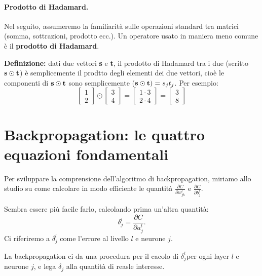 \paragraph{Prodotto di Hadamard.} Nel seguito, assumeremo la familiarità sulle operazioni standard tra matrici (somma, sottrazioni, prodotto ecc.). Un operatore usato in maniera meno comune è il \textbf{prodotto di Hadamard}.


\textbf{Definizione:} dati due vettori \textbf{s} e \textbf{t}, il prodotto di Hadamard tra i due (scritto $\text{\textbf{s}}\odot\text{\textbf{t}}$) è semplicemente il prodtto degli elementi dei due vettori, cioè le componenti di $\text{\textbf{s}}\odot\text{\textbf{t}}$ sono semplicemente ($\text{\textbf{s}}\odot\text{\textbf{t}})=s_jt_j$.
Per esempio:
\begin{equation}
    \begin{bmatrix}
        1\\
        2
    \end{bmatrix}
    \odot
    \begin{bmatrix}
        3\\
        4
    \end{bmatrix}
    =
    \begin{bmatrix}
        1\cdot 3\\
        2\cdot 4
    \end{bmatrix}
    =
    \begin{bmatrix}
        3\\
        8
    \end{bmatrix}
\end{equation}
\newpage
\section{Backpropagation: le quattro equazioni fondamentali}
Per sviluppare la comprensione dell'algoritmo di backpropagation, miriamo allo studio su come calcolare in modo efficiente le quantità $\frac{\partial C}{\partial w^l_{jk}}$ e $\frac{\partial C}{\partial b^l_{j}}$.


Sembra essere più facile farlo, calcolando prima un'altra quantità:
\begin{equation}
    \delta^l_j=\frac{\partial C}{\partial a^l_{j}}.
\end{equation}
Ci riferiremo a $\delta^l_j$ come l'errore al livello $l$ e neurone $j$. %


La backpropagation ci da una procedura per il cacolo di $\delta_j^l$per ogni layer $l$ e neurone $j$, e lega $\delta_j$ alla quantità di reasle interesse.

